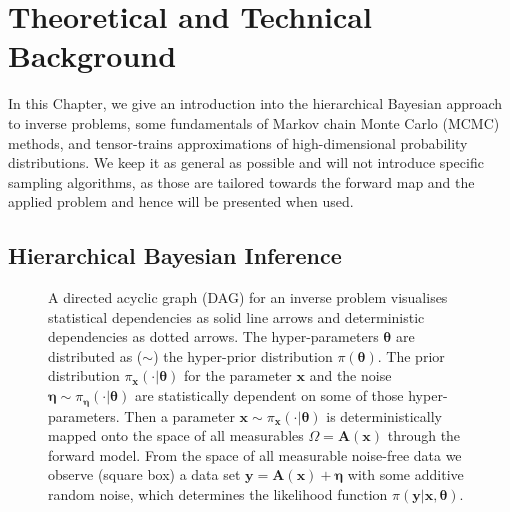 \chapter{Theoretical and Technical Background}
\label{ch:background}
In this Chapter, we give an introduction into the hierarchical Bayesian approach to inverse problems, some fundamentals of Markov chain Monte Carlo (MCMC) methods, and tensor-trains approximations of high-dimensional probability distributions.
We keep it as general as possible and will not introduce specific sampling algorithms, as those are tailored towards the forward map and the applied problem and hence will be presented when used.


\section{Hierarchical Bayesian Inference}
\label{sec:bayes}
\begin{figure}[ht!]
	\centering
	\caption[Hierarchical Bayesian Model]{A directed acyclic graph (DAG) for an inverse problem visualises statistical dependencies as solid line arrows and deterministic dependencies as dotted arrows.
		The hyper-parameters $\bm{\theta}$ are distributed as ($\sim$) the hyper-prior distribution $\pi(\bm{\theta})$.
		The prior distribution $ \pi_{\bm{x}}(\cdot|\bm{\theta})$ for the parameter $\bm{x}$ and the noise  $\bm{\eta} \sim \pi_{\bm{\eta}}(\cdot|\bm{\theta})$ are statistically dependent on some of those hyper-parameters.
		Then a parameter $\bm{x} \sim \pi_{\bm{x}}(\cdot|\bm{\theta})$ is deterministically mapped onto the space of all measurables $\Omega=\bm{A}(\bm{x})$ through the forward model.
		From the space of all measurable noise-free data we observe (square box) a data set $\bm{y} = \bm{A}(\bm{x}) + \bm{\eta}$ with some additive random noise, which determines the likelihood function $\pi(\bm{y}|\bm{x},\bm{\theta})$.}
	\label{fig:FirstDAG}
\end{figure}

